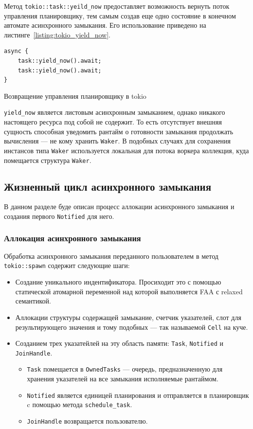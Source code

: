 Метод \verb|tokio::task::yeild_now| предоставляет возможность вернуть поток управления планировщику, тем самым создав еще одно состояние в конечном автомате асинхронного замыкания. Его использование приведено на листинге~\ref{listing:tokio_yield_now}.

\begin{listing}[H]
    \begin{verbatim}
async {
    task::yield_now().await;
    task::yield_now().await;
}
    \end{verbatim}

    \caption{Возвращение управления планировщику в tokio}
    \label{listing:tokio_yield_now}
\end{listing}

\verb|yield_now| является листовым асинхронным замыканием, однако никакого настоящего ресурса под собой не содержит. То есть отсутствует внешняя сущность способная уведомить рантайм о готовности замыкания продолжать вычисления --- не кому хранить \verb|Waker|. В подобных случаях для сохранения инстансов типа \verb|Waker| используется локальная для потока воркера коллекция, куда помещается структура \verb|Waker|.

\subsection{Жизненный цикл асинхронного замыкания}

В данном разделе буде описан процесс аллокации асинхронного замыкания и создания первого \verb|Notified| для него.

\subsubsection{Аллокация асинхронного замыкания}

Обработка асинхронного замыкания переданного пользователем в метод \verb|tokio::spawn| содержит следующие шаги:

\begin{itemize}
    \item Создание уникального индентификатора. Просиходит это с помощью статической атомарной переменной над которой выполняется FAA с relaxed семантикой.
    \item Аллокации структуры содержащей замыкание, счетчик указателей, слот для результирующего значения и тому подобных --- так называемой \verb|Cell| на куче.
    \item Созданием трех указатейлей на эту область памяти: \verb|Task|, \verb|Notified| и \verb|JoinHandle|.
    \begin{itemize}
        \item \verb|Task| помещается в \verb|OwnedTasks| --- очередь, предназначенную для хранения указателей на все замыкания исполняемые рантаймом.
        \item \verb|Notified| является единицей планирования и отправляется в планировщик c помощью метода \verb|schedule_task|.
        \item \verb|JoinHandle| возвращается пользователю.
    \end{itemize}
\end{itemize}

